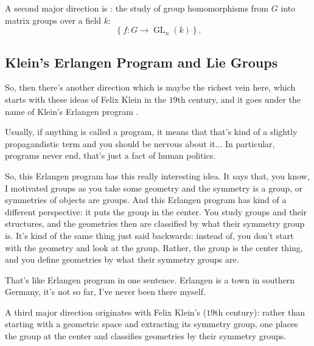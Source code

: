 \begin{content}
A second major direction is : the study of group homomorphisms from $G$ into matrix groups over a field $k$:
\[
\left\{ f \colon G \to \operatorname{GL}_n(k) \right\}.
\]
\end{content}

\subsection{Klein's Erlangen Program and Lie Groups}

\begin{speech}[00:35:43 - 00:37:16]
So, then there's another direction which is maybe the richest vein here, which starts with these ideas of Felix Klein in the $19$th century, and it goes under the name of Klein's Erlangen program .

Usually, if anything is called a program, it means that that's kind of a slightly propagandistic term and you should be nervous about it... In particular, programs never end, that's just a fact of human politics.

So, this Erlangen program has this really interesting idea. It says that, you know, I motivated groups as you take some geometry and the symmetry is a group, or symmetries of objects are groups. And this Erlangen program has kind of a different perspective: it puts the group in the center. You study groups and their structures, and the geometries then are classified by what their symmetry group is. It's kind of the same thing just said backwards: instead of, you don't start with the geometry and look at the group. Rather, the group is the center thing, and you define geometries by what their symmetry groups are.

That's like Erlangen program in one sentence. Erlangen is a town in southern Germany, it's not so far, I've never been there myself.
\end{speech}

\begin{content}
A third major direction originates with Felix Klein's  ($19$th century): rather than starting with a geometric space and extracting its symmetry group, one places the group at the center and classifies geometries by their symmetry groups.
\end{content}

